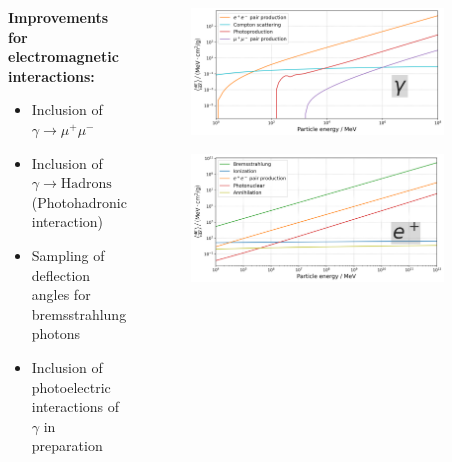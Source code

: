\begin{frame}

\begin{columns}[onlytextwidth]
    \begin{column}{0.45\textwidth}
    	\textbf{Improvements for electromagnetic interactions:}
    	\begin{itemize}
    		\item Inclusion of $\gamma \to \mu^+ \mu^-$
    		\item Inclusion of $\gamma \to \text{Hadrons}$ (Photohadronic interaction)
    		\item Sampling of deflection angles for bremsstrahlung photons
    		\item Inclusion of photoelectric interactions of $\gamma$ in preparation
    	\end{itemize}


    \end{column}
    \begin{column}{0.55\textwidth}

    \begin{figure}
    	\centering
        \includegraphics[width=0.9\textwidth]{plots/photon_dEdx.png}
    \end{figure}
    \vspace{-3mm}
    \begin{figure}
        \centering
        \includegraphics[width=0.9\textwidth]{plots/positron_dEdx.png}
    \end{figure}

    \end{column}
\end{columns}

\end{frame}

